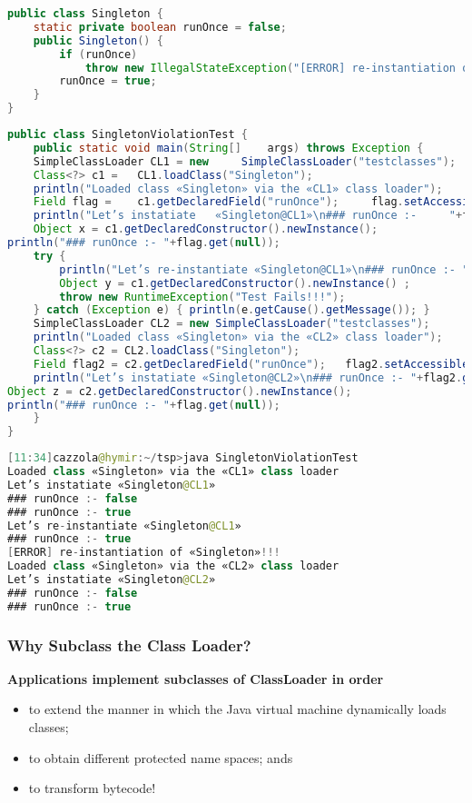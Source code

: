 \begin{lstlisting}[language=Java]
public class Singleton {
	static private boolean runOnce = false;
	public Singleton() {
		if (runOnce)
			throw new IllegalStateException("[ERROR] re-instantiation of «Singleton»!!!");
		runOnce = true;
	}
}
\end{lstlisting}

\begin{lstlisting}[language=Java]
public class SingletonViolationTest {
	public static void main(String[] 	args) throws Exception {
	SimpleClassLoader CL1 = new 	SimpleClassLoader("testclasses");
	Class<?> c1 = 	CL1.loadClass("Singleton");
	println("Loaded class «Singleton» via the «CL1» class loader");
	Field flag = 	c1.getDeclaredField("runOnce"); 	flag.setAccessible(true);
	println("Let’s instatiate 	«Singleton@CL1»\n### runOnce :- 	"+flag.get(null));
	Object x = c1.getDeclaredConstructor().newInstance();
println("### runOnce :- "+flag.get(null));
	try {
		println("Let’s re-instantiate «Singleton@CL1»\n### runOnce :- "+flag.get(null));
		Object y = c1.getDeclaredConstructor().newInstance() ;
		throw new RuntimeException("Test Fails!!!");
	} catch (Exception e) { println(e.getCause().getMessage()); }
	SimpleClassLoader CL2 = new SimpleClassLoader("testclasses");
	println("Loaded class «Singleton» via the «CL2» class loader");
	Class<?> c2 = CL2.loadClass("Singleton");
	Field flag2 = c2.getDeclaredField("runOnce"); 	flag2.setAccessible(true);
	println("Let’s instatiate «Singleton@CL2»\n### runOnce :- "+flag2.get(null));
Object z = c2.getDeclaredConstructor().newInstance();
println("### runOnce :- "+flag.get(null));
	}
}
\end{lstlisting}

\begin{lstlisting}[language=Java]
[11:34]cazzola@hymir:~/tsp>java SingletonViolationTest
Loaded class «Singleton» via the «CL1» class loader
Let’s instatiate «Singleton@CL1»
### runOnce :- false
### runOnce :- true
Let’s re-instantiate «Singleton@CL1»
### runOnce :- true
[ERROR] re-instantiation of «Singleton»!!!
Loaded class «Singleton» via the «CL2» class loader
Let’s instatiate «Singleton@CL2»
### runOnce :- false
### runOnce :- true
\end{lstlisting}

\subsubsection{Why Subclass the Class Loader?}

\textbf{Applications implement subclasses of ClassLoader in order}
\begin{itemize}
	\item to extend the manner in which the Java virtual machine dynamically loads classes;
	\item to obtain different protected name spaces; ands
	\item to transform bytecode!
\end{itemize}

